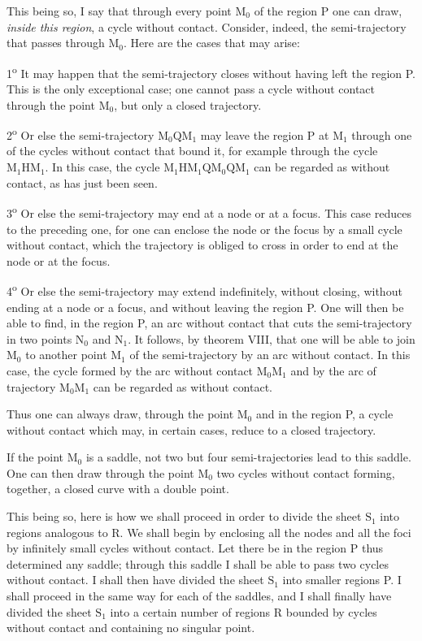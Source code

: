 \documentclass[11pt]{article}
\begin{document}
This being so, I say that through every point $\mathrm{M}_0$ of the region P one can draw, \emph{inside this region}, a cycle without contact. Consider, indeed, the semi-trajectory that passes through $\mathrm{M}_0$. Here are the cases that may arise:

1\textsuperscript{o} It may happen that the semi-trajectory closes without having left the region P. This is the only exceptional case; one cannot pass a cycle without contact through the point $\mathrm{M}_0$, but only a closed trajectory.

2\textsuperscript{o} Or else the semi-trajectory $\mathrm{M}_0\mathrm{Q}\mathrm{M}_1$ may leave the region P at $\mathrm{M}_1$ through one of the cycles without contact that bound it, for example through the cycle $\mathrm{M}_1\mathrm{H}\mathrm{M}_1$. In this case, the cycle $\mathrm{M}_1\mathrm{H}\mathrm{M}_1\mathrm{Q}\mathrm{M}_0\mathrm{Q}\mathrm{M}_1$ can be regarded as without contact, as has just been seen.

3\textsuperscript{o} Or else the semi-trajectory may end at a node or at a focus. This case reduces to the preceding one, for one can enclose the node or the focus by a small cycle without contact, which the trajectory is obliged to cross in order to end at the node or at the focus.

4\textsuperscript{o} Or else the semi-trajectory may extend indefinitely, without closing, without ending at a node or a focus, and without leaving the region P. One will then be able to find, in the region P, an arc without contact that cuts the semi-trajectory in two points $\mathrm{N}_0$ and $\mathrm{N}_1$. It follows, by theorem VIII, that one will be able to join $\mathrm{M}_0$ to another point $\mathrm{M}_1$ of the semi-trajectory by an arc without contact. In this case, the cycle formed by the arc without contact $\mathrm{M}_0\mathrm{M}_1$ and by the arc of trajectory $\mathrm{M}_0\mathrm{M}_1$ can be regarded as without contact.

Thus one can always draw, through the point $\mathrm{M}_0$ and in the region P, a cycle without contact which may, in certain cases, reduce to a closed trajectory.

If the point $\mathrm{M}_0$ is a saddle, not two but four semi-trajectories lead to this saddle. One can then draw through the point $\mathrm{M}_0$ two cycles without contact forming, together, a closed curve with a double point.

This being so, here is how we shall proceed in order to divide the sheet $\mathrm{S}_1$ into regions analogous to R. We shall begin by enclosing all the nodes and all the foci by infinitely small cycles without contact. Let there be in the region P thus determined any saddle; through this saddle I shall be able to pass two cycles without contact. I shall then have divided the sheet $\mathrm{S}_1$ into smaller regions P. I shall proceed in the same way for each of the saddles, and I shall finally have divided the sheet $\mathrm{S}_1$ into a certain number of regions R bounded by cycles without contact and containing no singular point.
\end{document}
